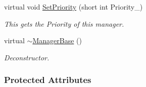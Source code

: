 \begin{DoxyCompactItemize}
virtual void \hyperlink{classphys_1_1ManagerBase_a6e30dc5f2a9c64f95efb2ef4428b0f98}{SetPriority} (short int Priority\_\-)
\begin{DoxyCompactList}\small\item\em This gets the Priority of this manager. \item\end{DoxyCompactList}\item 
virtual \hyperlink{classphys_1_1ManagerBase_a802dace8381459637297e9a372bfdf0c}{$\sim$ManagerBase} ()
\begin{DoxyCompactList}\small\item\em Deconstructor. \item\end{DoxyCompactList}\end{DoxyCompactItemize}
\subsubsection*{Protected Attributes}
